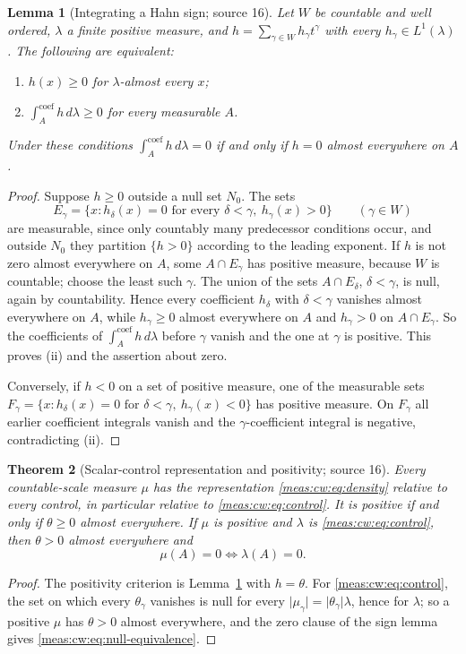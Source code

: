 \documentclass[11pt]{article}
\numberwithin{equation}{section}
\newtheorem{theorem}{Theorem}[section]
\newtheorem{lemma}[theorem]{Lemma}
\theoremstyle{definition}
\theoremstyle{remark}
\newcommand{\abs}[1]{\lvert#1\rvert}
\newcommand{\intc}{\mathop{\int}\nolimits^{\mathrm{coef}}}
\begin{document}
\begin{lemma}[Integrating a Hahn sign; source 16]\label{meas:cw:lem:sign}
Let $W$ be countable and well ordered, $\lambda$ a finite positive measure, and
$h=\sum_{\gamma\in W}h_\gamma t^\gamma$ with every $h_\gamma\in L^1(\lambda)$.
The following are equivalent:
\begin{enumerate}[label=(\roman*)]
\item $h(x)\ge0$ for $\lambda$-almost every $x$;
\item $\intc_Ah\,d\lambda\ge0$ for every measurable $A$.
\end{enumerate}
Under these conditions $\intc_Ah\,d\lambda=0$ if and only if $h=0$ almost
everywhere on $A$.
\end{lemma}
\begin{proof}
Suppose $h\ge0$ outside a null set $N_0$. The sets
\[
 E_\gamma=\{x:h_\delta(x)=0\text{ for every }\delta<\gamma,\ h_\gamma(x)>0\}
 \qquad(\gamma\in W)
\]
are measurable, since only countably many predecessor conditions occur, and
outside $N_0$ they partition $\{h>0\}$ according to the leading exponent. If $h$
is not zero almost everywhere on $A$, some $A\cap E_\gamma$ has positive measure,
because $W$ is countable; choose the least such $\gamma$. The union of the sets
$A\cap E_\delta$, $\delta<\gamma$, is null, again by countability. Hence every
coefficient $h_\delta$ with $\delta<\gamma$ vanishes almost everywhere on $A$, while
$h_\gamma\ge0$ almost everywhere on $A$ and $h_\gamma>0$ on $A\cap E_\gamma$. So the
coefficients of $\intc_Ah\,d\lambda$ before $\gamma$ vanish and the one at $\gamma$
is positive. This proves (ii) and the assertion about zero.

Conversely, if $h<0$ on a set of positive measure, one of the measurable sets
$F_\gamma=\{x:h_\delta(x)=0\text{ for }\delta<\gamma,\ h_\gamma(x)<0\}$ has positive
measure. On $F_\gamma$ all earlier coefficient integrals vanish and the
$\gamma$-coefficient integral is negative, contradicting (ii).
\end{proof}

\begin{theorem}[Scalar-control representation and positivity; source 16]
\label{meas:cw:thm:representation}
Every countable-scale measure $\mu$ has the representation
\eqref{meas:cw:eq:density} relative to every control, in particular relative
to \eqref{meas:cw:eq:control}. It is positive if and only if $\theta\ge0$
almost everywhere. If $\mu$ is positive and $\lambda$ is
\eqref{meas:cw:eq:control}, then $\theta>0$ almost everywhere and
\begin{equation}\label{meas:cw:eq:null-equivalence}
 \mu(A)=0\iff\lambda(A)=0 .
\end{equation}
\end{theorem}
\begin{proof}
The positivity criterion is Lemma~\ref{meas:cw:lem:sign} with $h=\theta$. For
\eqref{meas:cw:eq:control}, the set on which every $\theta_\gamma$ vanishes is null
for every $\abs{\mu_\gamma}=\abs{\theta_\gamma}\lambda$, hence for $\lambda$; so a
positive $\mu$ has $\theta>0$ almost everywhere, and the zero clause of the sign
lemma gives \eqref{meas:cw:eq:null-equivalence}.
\end{proof}
\end{document}
